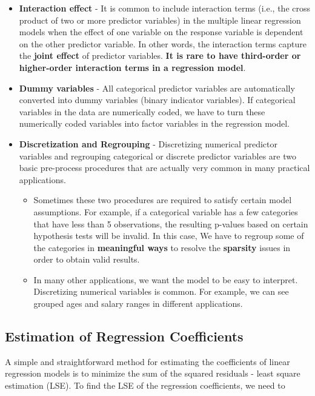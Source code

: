 \documentclass[
]{book}
\begin{document}
\begin{itemize}
\item
  \textbf{Interaction effect} - It is common to include interaction terms (i.e., the cross product of two or more predictor variables) in the multiple linear regression models when the effect of one variable on the response variable is dependent on the other predictor variable. In other words, the interaction terms capture the \textbf{joint effect} of predictor variables. \textbf{It is rare to have third-order or higher-order interaction terms in a regression model}.
\item
  \textbf{Dummy variables} - All categorical predictor variables are automatically converted into dummy variables (binary indicator variables). If categorical variables in the data are numerically coded, we have to turn these numerically coded variables into factor variables in the regression model.
\item
  \textbf{Discretization and Regrouping} - Discretizing numerical predictor variables and regrouping categorical or discrete predictor variables are two basic pre-process procedures that are actually very common in many practical applications.

  \begin{itemize}
  \item
    Sometimes these two procedures are required to satisfy certain model assumptions. For example, if a categorical variable has a few categories that have less than 5 observations, the resulting p-values based on certain hypothesis tests will be invalid. In this case, We have to regroup some of the categories in \textbf{meaningful ways} to resolve the \textbf{sparsity} issues in order to obtain valid results.
  \item
    In many other applications, we want the model to be easy to interpret. Discretizing numerical variables is common. For example, we can see grouped ages and salary ranges in different applications.
  \end{itemize}
\end{itemize}

\hypertarget{estimation-of-regression-coefficients}{%
\subsection{Estimation of Regression Coefficients}\label{estimation-of-regression-coefficients}}

A simple and straightforward method for estimating the coefficients of linear regression models is to minimize the sum of the squared residuals - least square estimation (LSE). To find the LSE of the regression coefficients, we need to
\end{document}
